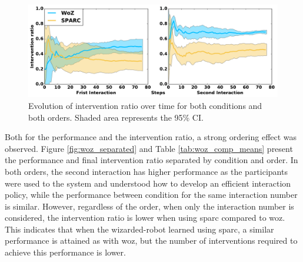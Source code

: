\begin{figure}[ht]
	\centering
	\includegraphics[width=1.\textwidth]{ratio_time.pdf}
	\caption{Evolution of intervention ratio over time for both conditions and both orders. Shaded area represents the 95\% CI.}
	\label{fig:woz_ratio_time}
\end{figure}

Both for the performance and the intervention ratio, a strong ordering effect was observed. Figure \ref{fig:woz_separated} and Table \ref{tab:woz_comp_means} present the performance and final intervention ratio separated by condition and order. In both orders, the second interaction has higher performance as the participants were used to the system and understood how to develop an efficient interaction policy, while the performance between condition for the same interaction number is similar. However, regardless of the order, when only the interaction number is considered, the intervention ratio is lower when using \gls{sparc} compared to \gls{woz}. This indicates that when the wizarded-robot learned using \gls{sparc}, a similar performance is attained as with \gls{woz}, but the number of interventions required to achieve this performance is lower.


